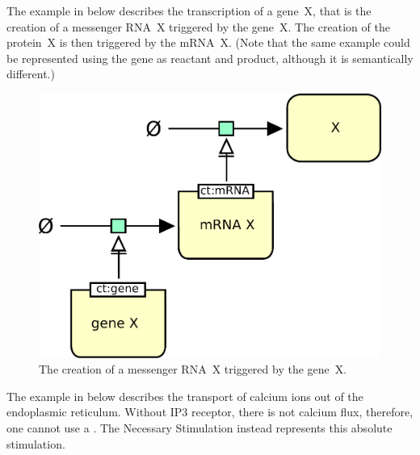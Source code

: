 The example in  below describes the transcription of a gene~X, that is the creation of a messenger RNA~X triggered by the gene~X.  The creation of the protein~X is then triggered by the mRNA~X.  (Note that the same example could be represented using the gene as reactant and product, although it is semantically different.)

\begin{figure}[htb]
  \centering
  \includegraphics[scale = 0.5]{le_images/necessary_stim-genetic}
  \caption{The creation of a messenger RNA~X triggered by the gene~X.}
  \label{fig:necessary_stim-gene}
\end{figure}


The example in  below describes the transport of calcium ions out of the endoplasmic reticulum. Without IP3 receptor, there is not calcium flux, therefore, one cannot use a . The Necessary Stimulation instead represents this absolute stimulation.

